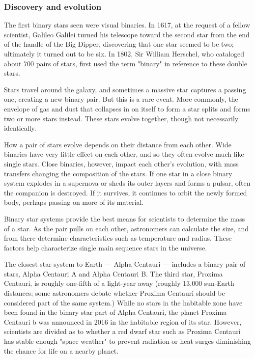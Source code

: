 \documentclass{article}
\begin{document}
\subsubsection{Discovery and evolution}
The first binary stars seen were visual binaries. In 1617, at the request of a fellow scientist, Galileo Galilei turned his telescope toward the second star from the end of the handle of the Big Dipper, discovering that one star seemed to be two; ultimately it turned out to be six. In 1802, Sir William Herschel, who cataloged about 700 pairs of stars, first used the term "binary" in reference to these double stars.
\\ \par
Stars travel around the galaxy, and sometimes a massive star captures a passing one, creating a new binary pair. But this is a rare event. More commonly, the envelope of gas and dust that collapses in on itself to form a star splits and forms two or more stars instead. These stars evolve together, though not necessarily identically.
\\ \par
How a pair of stars evolve depends on their distance from each other. Wide binaries have very little effect on each other, and so they often evolve much like single stars. Close binaries, however, impact each other's evolution, with mass transfers changing the composition of the stars. If one star in a close binary system explodes in a supernova or sheds its outer layers and forms a pulsar, often the companion is destroyed. If it survives, it continues to orbit the newly formed body, perhaps passing on more of its material.
\\ \par
Binary star systems provide the best means for scientists to determine the mass of a star. As the pair pulls on each other, astronomers can calculate the size, and from there determine characteristics such as temperature and radius. These factors help characterize single main sequence stars in the universe.
\\ \par
The closest star system to Earth — Alpha Centauri — includes a binary pair of stars, Alpha Centauri A and Alpha Centauri B. The third star, Proxima Centauri, is roughly one-fifth of a light-year away (roughly 13,000 sun-Earth distances; some astronomers debate whether Proxima Centauri should be considered part of the same system.) While no stars in the habitable zone have been found in the binary star part of Alpha Centauri, the planet Proxima Centauri b was announced in 2016 in the habitable region of its star. However, scientists are divided as to whether a red dwarf star such as Proxima Centauri has stable enough "space weather" to prevent radiation or heat surges diminishing the chance for life on a nearby planet.
\end{document}
